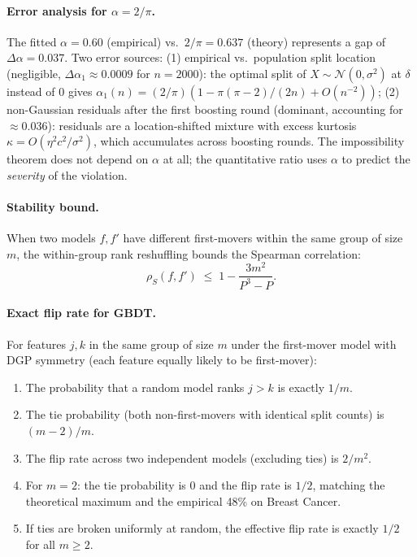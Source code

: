 \documentclass{jmlr}
\begin{document}
\paragraph{Error analysis for $\alpha = 2/\pi$.}
The fitted $\alpha = 0.60$ (empirical) vs.\ $2/\pi = 0.637$ (theory) represents a gap of $\Delta\alpha = 0.037$. Two error sources: (1) empirical vs.\ population split location (negligible, $\Delta\alpha_1 \approx 0.0009$ for $n = 2000$): the optimal split of $X \sim \mathcal{N}(0, \sigma^2)$ at $\delta$ instead of $0$ gives $\alpha_1(n) = (2/\pi)(1 - \pi(\pi-2)/(2n) + O(n^{-2}))$; (2) non-Gaussian residuals after the first boosting round (dominant, accounting for $\approx 0.036$): residuals are a location-shifted mixture with excess kurtosis $\kappa = O(\eta^2 c^2/\sigma^2)$, which accumulates across boosting rounds. The impossibility theorem does not depend on $\alpha$ at all; the quantitative ratio uses $\alpha$ to predict the \emph{severity} of the violation.

\paragraph{Stability bound.}
When two models $f, f'$ have different first-movers within the same group of size $m$, the within-group rank reshuffling bounds the Spearman correlation:
\[
    \rho_S(f, f') \;\leq\; 1 - \frac{3m^2}{P^3 - P}.
\]

\paragraph{Exact flip rate for GBDT.}
\begin{proposition}
\label{prop:exact-flip}
For features $j, k$ in the same group of size $m$ under the first-mover model with DGP symmetry (each feature equally likely to be first-mover):
\begin{enumerate}
    \item[(i)] The probability that a random model ranks $j > k$ is exactly $1/m$.
    \item[(ii)] The tie probability (both non-first-movers with identical split counts) is $(m-2)/m$.
    \item[(iii)] The flip rate across two independent models (excluding ties) is $2/m^2$.
    \item[(iv)] For $m = 2$: the tie probability is $0$ and the flip rate is $1/2$, matching the theoretical maximum and the empirical 48\% on Breast Cancer.
    \item[(v)] If ties are broken uniformly at random, the effective flip rate is exactly $1/2$ for all $m \geq 2$.
\end{enumerate}
\end{proposition}
\end{document}
